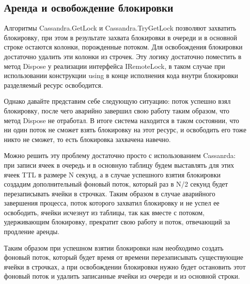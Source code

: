 \subsection{Аренда и освобождение блокировки}

Алгоритмы Cassandra.GetLock и Cassandra.TryGetLock позволяют захватить блокировку, при этом в результате захвата блокировки в очереди и в основной строке остаются колонки, порожденные потоком. Для освобождения блокировки достаточно удалить эти колонки из строчек. Эту логику достаточно поместить в метод Dispose у реализации интерфейса IRemoteLock, в таком случае при использовании конструкции using в конце исполнения кода внутри блокировки разделяемый ресурс освободится.

Однако давайте представим себе следующую ситуацию: поток успешно взял блокировку, после чего аварийно завершил свою работу таким образом, что метод Dispose не отработал. В итоге система находится в таком состоянии, что ни один поток не сможет взять блокировку на этот ресурс, и освободить его тоже никто не сможет, то есть блокировка захвачена навечно.

Можно решить эту проблему достаточно просто с использованием Cassanrda: при записи ячеек в очередь и в основную таблицу будем выставлять для этих ячеек TTL в размере N секунд, а в случае успешного взятия блокировки создадим дополнительный фоновый поток, который раз в N/2 секунд будет перезаписывать ячейки в строчках. Таким образом в случае аварийного завершения процесса, поток которого захватил блокировку и не успел ее освободить, ячейки исчезнут из таблицы, так как вместе с потоком, удерживающим блокировку, прекратит свою работу и поток, отвечающий за продление аренды.

Таким образом при успешном взятии блокировки нам необходимо создать фоновый поток, который будет время от времени перезаписывать существующие ячейки в строчках, а при освобождении блокировки нужно будет остановить этот фоновый поток и удалить записанные ячейки из очереди и из основной строки.